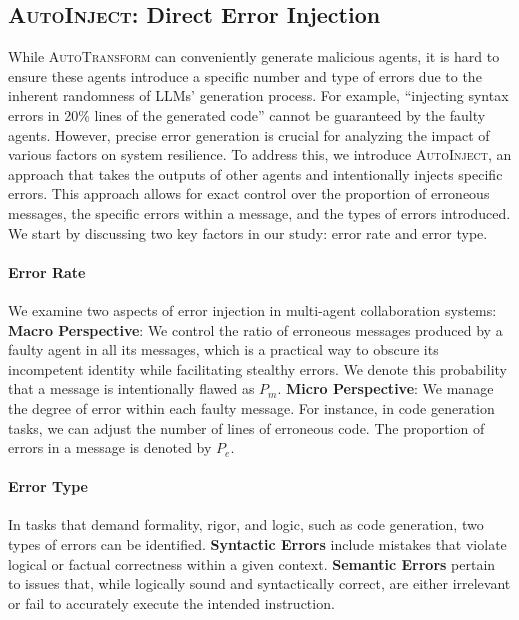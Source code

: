 \documentclass{article}
\theoremstyle{plain}
\theoremstyle{definition}
\theoremstyle{remark}
\begin{document}
\subsection{\textsc{AutoInject}: Direct Error Injection}
\label{sec:auto-inject}

While \textsc{AutoTransform} can conveniently generate malicious agents, it is hard to ensure these agents introduce a specific number and type of errors due to the inherent randomness of LLMs' generation process.
For example, ``injecting syntax errors in 20\% lines of the generated code'' cannot be guaranteed by the faulty agents.
However, precise error generation is crucial for analyzing the impact of various factors on system resilience.
To address this, we introduce \textsc{AutoInject}, an approach that takes the outputs of other agents and intentionally injects specific errors.
This approach allows for exact control over the proportion of erroneous messages, the specific errors within a message, and the types of errors introduced.
We start by discussing two key factors in our study: error rate and error type.

\paragraph{Error Rate}
We examine two aspects of error injection in multi-agent collaboration systems:
\textbf{Macro Perspective}:
We control the ratio of erroneous messages produced by a faulty agent in all its messages, which is a practical way to obscure its 
incompetent identity while facilitating stealthy errors.
We denote this probability that a message is intentionally flawed as $P_m$.
\textbf{Micro Perspective}:
We manage the degree of error within each faulty message.
For instance, in code generation tasks, we can adjust the number of lines of erroneous code.
The proportion of errors in a message is denoted by $P_e$.

\paragraph{Error Type}
In tasks that demand formality, rigor, and logic, such as code generation, two types of errors can be identified.
\textbf{Syntactic Errors} include mistakes that violate logical or factual correctness within a given context.
\textbf{Semantic Errors} pertain to issues that, while logically sound and syntactically correct, are either irrelevant or fail to accurately execute the intended instruction.
\end{document}
